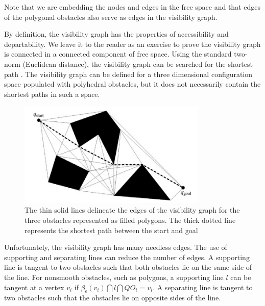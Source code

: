 \documentclass[11pt]{article}
\begin{document}
Note that we are embedding the nodes and edges in the free space and that edges of the polygonal obstacles also serve as edges in the visibility graph.

By definition, the visibility graph has the properties of accessibility and departability. We leave it to the reader as an exercise to prove the visibility graph is connected in a connected component of free space. Using the standard two-norm (Euclidean distance), the visibility graph can be searched for the shortest path . The visibility graph can be defined for a three dimensional configuration space populated with polyhedral obstacles, but it does not necessarily contain the shortest paths in such a space.\\

\begin{figure}[h]
  \centering
  \includegraphics[width=9cm]{imgs/shortest_path.png}
  \caption{The thin solid lines delineate the edges of the visibility graph for the three obstacles represented as filled polygons. The thick dotted line represents the shortest path between the start and goal}
\end{figure}

Unfortunately, the visibility graph has many needless edges. The use of supporting and separating lines can reduce the number of edges. A supporting line is tangent to two obstacles such that both obstacles lie on the same side of the line. For nonsmooth obstacles, such as polygons, a supporting line $l$ can be tangent at a vertex $v_i$ if $\beta_\epsilon(v_i) \bigcap l \bigcap QO_i = v_i $. A separating line is tangent to two obstacles such that the obstacles lie on opposite sides of the line.\\
\end{document}
